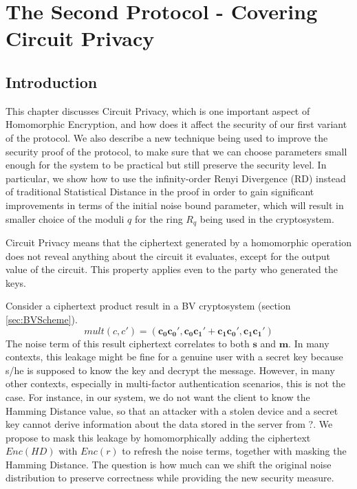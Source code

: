 \chapter{The Second Protocol - Covering Circuit Privacy}
\label{chap:renyiDivergence}

\ifpdf
    \graphicspath{{Chapter4/Figs/Raster/}{Chapter4/Figs/PDF/}{Chapter4/Figs/}}
\else
    \graphicspath{{Chapter4/Figs/Vector/}{Chapter4/Figs/}}
\fi

\section{Introduction}
\label{sec:secProcIntro}
This chapter discusses Circuit Privacy, which is one important aspect of
Homomorphic Encryption, and how does it affect the security of our first variant
of the protocol. We also describe a new technique being used to improve the
security proof of the protocol, to make sure that we can choose parameters small
enough for the system to be practical but still preserve the security level. In
particular, we show how to use the infinity-order Renyi Divergence (RD) instead of
traditional Statistical Distance in the proof in order to gain significant
improvements in terms of the initial noise bound parameter, which will result in
smaller choice of the moduli \(q\) for the ring \(R_{q}\) being used in the
cryptosystem.

Circuit Privacy means that the ciphertext generated by a homomorphic operation
does not reveal anything about the circuit it evaluates, except for the output
value of the circuit. This property applies even to the party who generated the
keys.

Consider a ciphertext product result in a BV cryptosystem (section
\ref{sec:BVScheme}).
\[
  mult(c,c') = (\mathbf{c_0}\mathbf{c_0'}, \mathbf{c_0}\mathbf{c_1'} +
  \mathbf{c_1}\mathbf{c_0'}, \mathbf{c_1}\mathbf{c_1'})
\]
The noise term of this result ciphertext correlates to both $\mathbf{s}$ and
$\mathbf{m}$.  In many contexts, this leakage might be fine for a genuine user
with a secret key because s/he is supposed to know the key and decrypt the
message.  However, in many other contexts, especially in multi-factor
authentication scenarios, this is not the case. For instance, in our system, we
do not want the client to know the Hamming Distance value, so that an attacker
with a stolen device and a secret key cannot derive information about the data
stored in the server from ?. We propose to mask this leakage by homomorphically
adding the ciphertext $Enc(HD)$ with $Enc(r)$ to refresh the noise terms,
together with masking the Hamming Distance. The question is how much can we
shift the original noise distribution to preserve correctness while providing
the new security measure.


